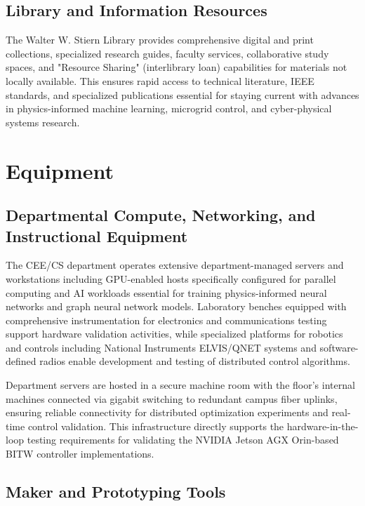 \documentclass[12pt]{article}
\begin{document}
\subsection{Library and Information Resources}

The Walter W. Stiern Library provides comprehensive digital and print collections, specialized research guides, faculty services, collaborative study spaces, and "Resource Sharing" (interlibrary loan) capabilities for materials not locally available. This ensures rapid access to technical literature, IEEE standards, and specialized publications essential for staying current with advances in physics-informed machine learning, microgrid control, and cyber-physical systems research.

\section{Equipment}

\subsection{Departmental Compute, Networking, and Instructional Equipment}

The CEE/CS department operates extensive department-managed servers and workstations including GPU-enabled hosts specifically configured for parallel computing and AI workloads essential for training physics-informed neural networks and graph neural network models. Laboratory benches equipped with comprehensive instrumentation for electronics and communications testing support hardware validation activities, while specialized platforms for robotics and controls including National Instruments ELVIS/QNET systems and software-defined radios enable development and testing of distributed control algorithms.

Department servers are hosted in a secure machine room with the floor's internal machines connected via gigabit switching to redundant campus fiber uplinks, ensuring reliable connectivity for distributed optimization experiments and real-time control validation. This infrastructure directly supports the hardware-in-the-loop testing requirements for validating the NVIDIA Jetson AGX Orin-based BITW controller implementations.

\subsection{Maker and Prototyping Tools}
\end{document}

